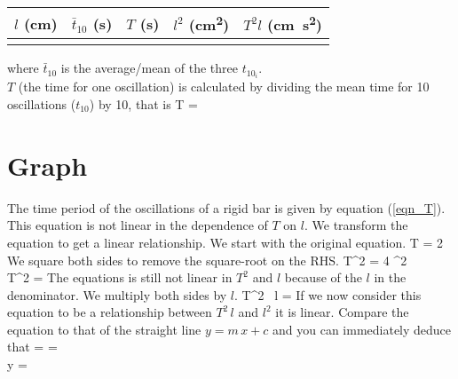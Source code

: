 \documentclass{article}
\begin{document}
      \begin{table}[h]
         \centering

         \begin{tabular}{| c || c | c || c | c ||}

            \hline
            $l$ (\si{\centi\metre}) & $\bar{t}_{10}$ (\si{\second}) & $T$ (\si{\second}) & $l^2$ (\si{\square\centi\metre}) & $T^2 l$ (\si{\centi\metre \square\second}) \\

            \hline
               & & & & \\
            \hline

         \end{tabular}
      \end{table}
      where $\bar{t}_{10}$ is the average/mean of the three $t_{10_i}$.\\         
      
      $T$ (the time for one oscillation) is calculated by dividing the mean time for 10 oscillations ($t_{10}$) by 10, that is
      \beq \label{calc_T}
         T = 
      \eeq


   \section*{Graph}

      The time period of the oscillations of a rigid bar is given by equation (\ref{eqn_T}). This equation is not linear in the dependence of $T$ on $l$. We transform the equation to get a linear relationship. We start with the original equation.
%
      \beqn
         T = 2 \pi {}
      \eeqn
      We square both sides to remove the square-root on the RHS.
      \beqsn
         T^2 = 4 \pi^2  \\[0.25\baselineskip]
         \imply T^2 =  
      \eeqsn
      The equations is still not linear in $T^2$ and $l$ because of the $l$ in the denominator. We multiply both sides by $l$.
      \beq
         T^2 \, l =  
      \eeq
      If we now consider this equation to be a relationship between $T^2 \, l$ and $l^2$ it is linear. Compare the equation to that of the straight line $y = m \, x + c$ and you can immediately deduce that
      \beqc \label{graph}
          =  = \\[0.5\baselineskip]
         y = 
      \eeqc
\end{document}
